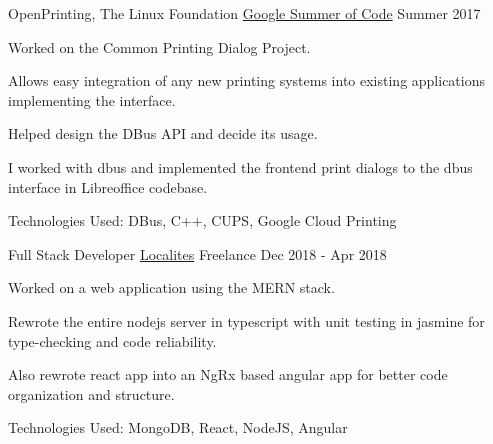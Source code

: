 \begin{cventries}
  \cventry
  {OpenPrinting, The Linux Foundation}
  {\href{https://yashsriv.org/2017/08/gsoc.html}{Google Summer of Code}}
  {}
  {Summer 2017}
  {
    \begin{cvitems}
      \item Worked on the Common Printing Dialog Project.
      \item Allows easy integration of any new printing systems into existing
        applications implementing the interface.
      \item Helped design the DBus API and decide its usage.
      \item I worked with dbus and implemented the frontend print dialogs to the
        dbus interface in Libreoffice codebase.
        \ifdefined \ONEPAGE \else
      \item Technologies Used: DBus, C++, CUPS, Google Cloud Printing
        \fi
    \end{cvitems}
  }

  \cventry
  {Full Stack Developer}
  {\href{http://www.localites.com}{Localites}}
  {Freelance}
  {Dec 2018 - Apr 2018}
  {
    \begin{cvitems}
    \item Worked on a web application using the MERN stack.
    \item Rewrote the entire nodejs server in typescript with unit testing in
      jasmine for type-checking and code reliability.
    \item Also rewrote react app into an NgRx based angular app for better code
      organization and structure.
        \ifdefined \ONEPAGE \else
    \item Technologies Used: MongoDB, React, NodeJS, Angular
        \fi
    \end{cvitems}
  }

\end{cventries}
\vspace{-2mm}

